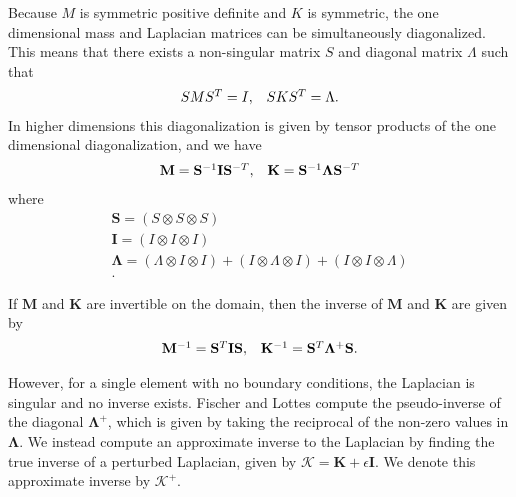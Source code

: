 Because $M$ is symmetric positive definite and $K$ is symmetric, the one dimensional mass and Laplacian matrices can be simultaneously diagonalized.
This means that there exists a non-singular matrix $S$ and diagonal matrix $\Lambda$ such that
\begin{equation}
\begin{array}{c c}
S M S^T = I,  &  S K S^T = \Lambda.
\end{array}
\end{equation}
In higher dimensions this diagonalization is given by tensor products of the one dimensional diagonalization, and we have
\begin{equation}
\begin{array}{c c}
\mathbf{M}   = \mathbf{S}^{-1} \mathbf{I} \mathbf{S}^{-T},  &  \mathbf{K} = \mathbf{S}^{-1} \mathbf{\Lambda} \mathbf{S}^{-T}  \\
\end{array}
\end{equation}
where
\begin{equation}
\begin{array}{c}
\mathbf{S}       = \left( S \otimes S \otimes S \right)  \\
\mathbf{I}       = \left( I \otimes I \otimes I \right)  \\
\mathbf{\Lambda} = \left( \Lambda \otimes I \otimes I \right) + \left( I \otimes \Lambda \otimes I \right) + \left( I \otimes I \otimes \Lambda \right)  \\.
\end{array}
\end{equation}

If $\mathbf{M}$ and $\mathbf{K}$ are invertible on the domain, then the inverse of $\mathbf{M}$ and $\mathbf{K}$ are given by
\begin{equation}
\begin{array}{c c}
\mathbf{M}^{-1} = \mathbf{S}^T \mathbf{I} \mathbf{S},  &  \mathbf{K}^{-1} = \mathbf{S}^T \mathbf{\Lambda}^{+} \mathbf{S}.
\end{array}
\end{equation}

However, for a single element with no boundary conditions, the Laplacian is singular and no inverse exists.
Fischer and Lottes \cite{fischer2005hybrid} compute the pseudo-inverse of the diagonal $\mathbf{\Lambda}^{+}$, which is given by taking the reciprocal of the non-zero values in $\mathbf{\Lambda}$.
We instead compute an approximate inverse to the Laplacian by finding the true inverse of a perturbed Laplacian, given by $\boldsymbol{\mathcal{K}} = \mathbf{K} + \epsilon \mathbf{I}$.
We denote this approximate inverse by $\boldsymbol{\mathcal{K}}^+$.

